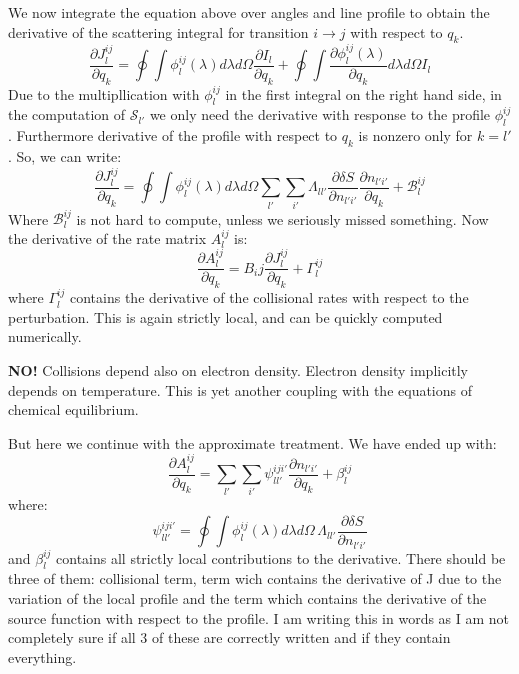 \documentclass[a4paper]{article}
\begin{document}
We now integrate the equation above over angles and line profile to obtain the derivative of the scattering integral for transition $i\rightarrow j$ with respect to $q_k$.
\begin{equation}
\frac{\partial J_l^{ij}}{\partial q_k} = \oint \int \phi_l^{ij}(\lambda) d\lambda d \Omega \frac{\partial I_l}{\partial q_k} + \oint \int \frac{\partial \phi_l^{ij}(\lambda)}{\partial q_k} d \lambda d\Omega I_l
\end{equation}
Due to the multipllication with $\phi_l^{ij}$ in the first integral on the right hand side, in the computation of $\mathcal S_{l'}$ we only need the derivative with response to the profile $\phi^{ij}_l$. Furthermore derivative of the profile with respect to $q_k$ is nonzero only for $k=l'$. So, we can write:
\begin{equation}
\frac{\partial J_l^{ij}}{\partial q_k} = \oint \int \phi_l^{ij}(\lambda) d\lambda d \Omega \sum_{l'} \sum_{i'} \Lambda_{ll'} \frac{\partial \delta S}{\partial n_{l'i'}} \frac{\partial n_{l'i'}}{\partial q_k} + \mathcal{B}_l^{ij}
\end{equation} 
Where $\mathcal {B}_l^{ij}$ is not hard to compute, unless we seriously missed something. Now the derivative of the rate matrix $A_l^{ij}$ is:
\begin{equation}
\frac{\partial A_l^{ij}}{\partial q_k} = B_ij \frac{\partial J_l^{ij}}{\partial q_k} + \Gamma_l^{ij}
\end{equation}
where $\Gamma_l^{ij}$ contains the derivative of the collisional rates with respect to the perturbation. This is again strictly local, and can be quickly computed numerically. 

\textbf{NO!} Collisions depend also on electron density. Electron density implicitly depends on temperature. This is yet another coupling with the equations of chemical equilibrium.

But here we continue with the approximate treatment. We have ended up with:
\begin{equation}
\frac{\partial A_l^{ij}}{\partial q_k} = \sum_{l'} \sum_{i'} \psi_{ll'}^{iji'} \frac{\partial n_{l'i'}}{\partial q_k} + \beta_l^{ij}
\end{equation}
where:
\begin{equation}
\psi_{ll'}^{iji'} = \oint \int \phi_l^{ij}(\lambda) d\lambda d\Omega \, \Lambda_{ll'} \frac{\partial \delta S}{\partial n_{l'i'}}
\end{equation}
and $\beta_l^{ij}$ contains all strictly local contributions to the derivative. There should be three of them: collisional term, term wich contains the derivative of J due to the variation of the local profile and the term which contains the derivative of the source function with respect to the profile. I am writing this in words as I am not completely sure if all 3 of these are correctly written and if they contain everything. 
\end{document}
